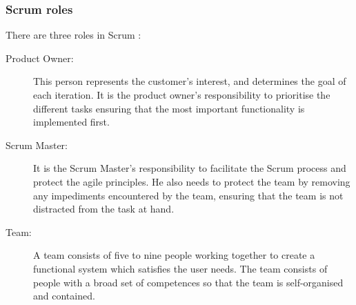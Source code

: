 \subsubsection{Scrum roles}
There are three roles in Scrum \parencite{ScrumGoesFormal}:
\begin{description}
	\item [Product Owner:] This person represents the customer’s interest, and 
		determines the goal of each iteration. It is the product owner's responsibility
		to prioritise the different tasks ensuring that the most important functionality
		is implemented first.
	\item [Scrum Master:] It is the Scrum Master's responsibility to facilitate the Scrum 
		process and protect the agile principles. He also needs to protect the team by
		removing any impediments encountered by the team, ensuring that the team is not
		distracted from the task at hand.
	\item [Team:] A team consists of five to nine people working together to create
		a functional system which satisfies the user needs. The team consists of people
		with a broad set of competences so that the team is self-organised and contained.
\end{description}

